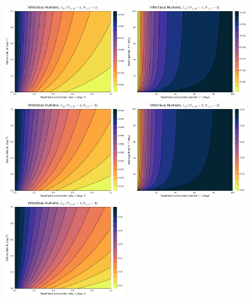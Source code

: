 \documentclass[11pt]{article}
\begin{document}
\begin{figure}[H]
  \centering
  \includegraphics[width=0.4\textwidth]{../../fig/Ih_rates_txh_1x1_cal.pdf}
  \includegraphics[width=0.4\textwidth]{../../fig/Ih_periods_txh_1x1_cal.pdf}\\
  \includegraphics[width=0.4\textwidth]{../../fig/Ih_rates_txh_2x2_cal.pdf}
  \includegraphics[width=0.4\textwidth]{../../fig/Ih_periods_txh_2x2_cal.pdf}\\
  \includegraphics[width=0.4\textwidth]{../../fig/Ih_rates_txh_4x4_cal.pdf}

\end{figure}
\end{document}

